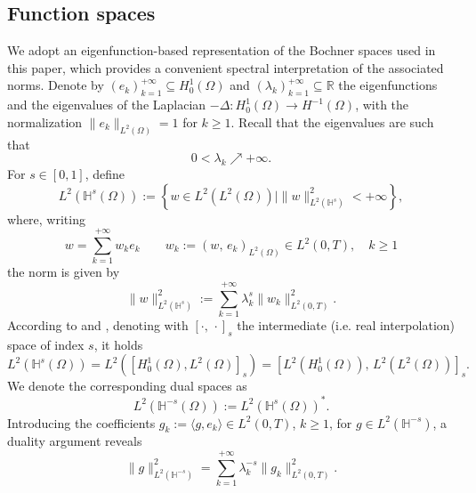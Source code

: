 \documentclass{amsart}
\theoremstyle{plain}
\theoremstyle{remark}
\numberwithin{equation}{section}
\numberwithin{theorem}{section}
\newcommand{\R}{\mathbb{R}}
\begin{document}
\subsection{Function spaces} 
We adopt an eigenfunction-based representation of the Bochner spaces used in this paper, which provides a convenient spectral interpretation of the associated norms. Denote by $(e_k)_{k=1}^{+\infty} \subseteq H^1_0(\Omega)$ and $(\lambda_k)_{k=1}^{+\infty} \subseteq \R$ the eigenfunctions and the eigenvalues of the  Laplacian $-\Delta: H^1_0(\Omega) \to H^{-1}(\Omega)$, with the normalization $\|e_k\|_{L^2(\Omega)} = 1$ for $k \geq 1$. Recall that the eigenvalues are such that 
\begin{equation}
\label{eq:eigenvalues}
0 < \lambda_k \nearrow +\infty.
\end{equation}
For $s\in[0,1]$, define
\begin{equation}
    \label{eq:SpectralRepresentationOfBochnerSpaces}
     L^2(\mathbb H^s(\Omega)) := \left\{w\in L^2(L^2(\Omega)) \mid \|w\|_{L^2(\mathbb H^s)}^2 <+\infty \right\},
\end{equation}
where, writing
\begin{equation}
    \label{eq:FunctionExpansion}
    w = \sum_{k=1}^{+\infty}w_k e_k \qquad w_k:=(w,\,e_k)_{L^2(\Omega)}\in L^2(0,T),\quad k\ge 1
\end{equation}
the norm is given by
\begin{equation}
    \label{eq:NormRepresentation}
    \|w\|_{L^2(\mathbb H^s)}^2 := \sum_{k=1}^{+\infty} \lambda_k^s\|w_k\|^2_{L^2(0,T)}.
\end{equation}
According to \cite[Section $2.5.1$, Appendix A]{Lischke.Pang.Gulian:20} and \cite[Chapter 1, Theorem 12.6]{Lions.Magenes:72}, denoting with $[\cdot,\,\cdot]_s$ the intermediate (i.e. real interpolation) space of index $s$, it holds
\begin{equation}
    \label{eq:InterpolationSpaces}
        L^2(\mathbb H^s(\Omega))  = L^2([H^1_0(\Omega), L^2(\Omega)]_s) = [L^2(H^1_0(\Omega)),\,L^2(L^2(\Omega))]_s.
\end{equation}
We denote the corresponding dual spaces as
\begin{equation*}
L^2(\mathbb H^{-s}(\Omega)) := L^2(\mathbb H^s(\Omega))^*.
\end{equation*}
Introducing the coefficients $g_k := \langle g, e_k\rangle \in L^2(0,T)$, $k \geq 1$, for $g \in L^2(\mathbb H ^{-s})$, a duality argument reveals
\begin{equation}
\label{eq:DualNormRepresentation}
    \|g\|_{L^2(\mathbb H^{-s})}^2 = \sum_{k=1}^{+\infty} \lambda_k^{-s}\|g_k\|^2_{L^2(0,T)}.
\end{equation}
\end{document}
